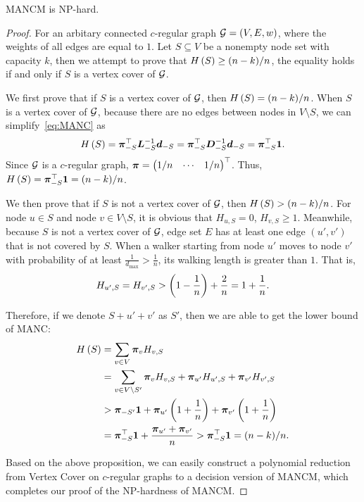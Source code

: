 \documentclass[sigconf]{acmart}
\begin{document}
\begin{theorem}\label{thm:np-hard}
  MANCM is NP-hard.
\end{theorem}
\begin{proof}
  For an arbitary connected \(c\)-regular graph \(\mathcal{G}=(V,E,w)\), where the weights of all edges are equal to \(1\).
  Let \(S\subseteq V\) be a nonempty node set with capacity \(k\), then we attempt to prove that \(H\left(S\right)\ge (n-k)/n\), the equality holds if and only if \(S\) is a vertex cover of \(\mathcal{G}\).

  We first prove that if \(S\) is a vertex cover of \(\mathcal{G}\), then \(H\left(S\right)=(n-k)/n\).
  When \(S\) is a vertex cover of \(\mathcal{G}\), because there are no edges between nodes in \(V\setminus S\), we can simplify~\eqref{eq:MANC} as
  \[H\left(S\right)=\boldsymbol{\pi}_{-S}^\top\boldsymbol{L}_{-S}^{-1}\boldsymbol{d}_{-S}=\boldsymbol{\pi}_{-S}^\top\boldsymbol{D}_{-S}^{-1}\boldsymbol{d}_{-S}=\boldsymbol{\pi}_{-S}^\top\boldsymbol{1}.\]
  Since \(\mathcal{G}\) is a \(c\)-regular graph, \(\boldsymbol{\pi}=\begin{pmatrix}1/n&\cdots&1/n\end{pmatrix}^\top\).
  Thus, \(H\left(S\right)=\boldsymbol{\pi}_{-S}^\top\boldsymbol{1}=(n-k)/n\).

  We then prove that if \(S\) is not a vertex cover of \(\mathcal{G}\), then \(H\left(S\right)>(n-k)/n\).
  For node \(u\in S\) and node \(v\in V\setminus S\), it is obvious that \(H_{u,S}=0\), \(H_{v,S}\ge1\).
  Meanwhile, because \(S\) is not a vertex cover of \(\mathcal{G}\), edge set \(E\) has at least one edge \((u',v')\) that is not covered by \(S\).
  When a walker starting from node \(u'\) moves to node \(v'\) with probability of at least \(\frac{1}{d_{\max}}>\frac{1}{n}\), its walking length is greater than \(1\).
  That is,
  \[H_{u',S}=H_{v',S}>\left( 1-\frac{1}{n} \right)+\frac{2}{n}=1+\frac{1}{n}.\]

  Therefore, if we denote \(S+u'+v'\) as \(S'\), then we are able to get the lower bound of MANC:
  \begin{align*}
    H\left(S\right) & =\sum_{v\in V}\boldsymbol{\pi}_vH_{v,S}                                                          \\
             & =\sum_{v\in V\setminus S'}\boldsymbol{\pi}_vH_{v,S}+\boldsymbol{\pi}_{u'}H_{u',S}+\boldsymbol{\pi}_{v'}H_{v',S}      \\
             & >\boldsymbol{\pi}_{-S'}\boldsymbol{1}+\boldsymbol{\pi}_{u'}\left( 1+\frac{1}{n} \right)+\boldsymbol{\pi}_{v'}\left( 1+\frac{1}{n} \right) \\
             & =\boldsymbol{\pi}_{-S}^\top\boldsymbol{1}+\frac{\boldsymbol{\pi}_{u'}+\boldsymbol{\pi}_{v'}}n
    >\boldsymbol{\pi}_{-S}^\top\boldsymbol{1}=(n-k)/n.
  \end{align*}

  Based on the above proposition, we can easily construct a polynomial reduction from Vertex Cover on \(c\)-regular graphs to a decision version of MANCM, which completes our proof of the NP-hardness of MANCM.

\end{proof}
\end{document}
